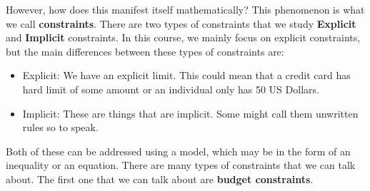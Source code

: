 \documentclass{article}
\begin{document}
However, how does this manifest itself mathematically? This phenomenon is what we call \textbf{constraints}. There are two types of constraints that we study \textbf{Explicit} and \textbf{Implicit} constraints. In this course, we mainly focus on explicit constraints, but the main differences between these types of constraints are:
\begin{itemize}
    \item Explicit: We have an explicit limit. This could mean that a credit card has hard limit of some amount or an individual only has 50 US Dollars.
    \item Implicit: These are things that are implicit. Some might call them unwritten rules so to speak.
\end{itemize}
Both of these can be addressed using a model, which may be in the form of an inequality or an equation. There are many types of constraints that we can talk about. The first one that we can talk about are \textbf{budget constraints}.\\
\end{document}
